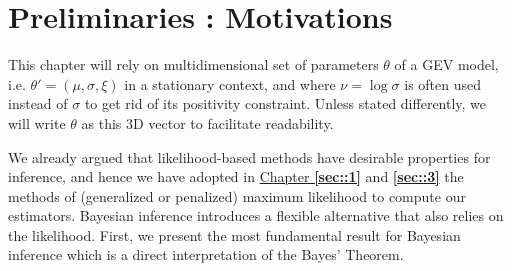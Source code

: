 \section{Preliminaries : Motivations}\label{sec:bayprelim}


This chapter will rely on 	 multidimensional set of parameters $\theta$ of a GEV model, i.e. $\theta'=(\mu,\sigma,\xi)$ in a stationary context, and where $\nu=\log \sigma$ is often used instead of $\sigma$ to get rid of its positivity constraint.
 Unless stated differently, we will write $\theta$ as this $3$D vector to facilitate readability.
 
We already argued that likelihood-based methods have desirable properties for inference, and hence we have adopted in \hyperref[sec::1]{Chapter \textbf{\ref{sec::1}}} and \textbf{\ref{sec::3}} the methods of (generalized or penalized) maximum likelihood to compute our estimators. Bayesian inference introduces a flexible alternative that also relies on the likelihood. First, we present the most fundamental result for Bayesian inference which is a direct interpretation of the Bayes' Theorem.

